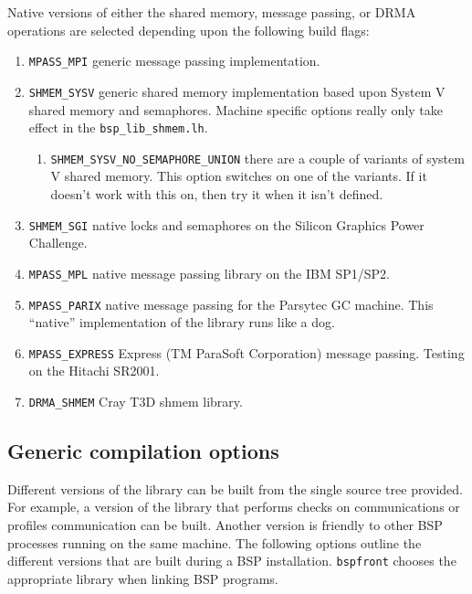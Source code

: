 Native versions of either the shared memory, message passing, or DRMA
operations are selected depending upon the following build flags:
\begin{enumerate}
\item \texttt{MPASS\_MPI} generic message passing implementation.

\item \texttt{SHMEM\_SYSV} generic shared memory implementation based
  upon System V shared memory and semaphores. Machine specific options
  really only take effect in the \texttt{bsp\_lib\_shmem.lh}.
  \begin{enumerate}
  \item \texttt{SHMEM\_SYSV\_NO\_SEMAPHORE\_UNION} there are a couple
    of variants of system V shared memory. This option switches
    on one of the variants. If it doesn't work with this on, then try
    it when it isn't defined.
  \end{enumerate}

\item \texttt{SHMEM\_SGI} native locks and semaphores on the Silicon
  Graphics Power Challenge.


\item \texttt{MPASS\_MPL} native message passing library on the IBM SP1/SP2.

\item \texttt{MPASS\_PARIX} native message passing for the Parsytec
  GC machine. This ``native'' implementation of the library runs like
  a dog.

\item \texttt{MPASS\_EXPRESS} Express (TM ParaSoft Corporation)
  message passing. Testing on the Hitachi SR2001.

\item \texttt{DRMA\_SHMEM} Cray T3D shmem library.
\end{enumerate}


\subsection{Generic compilation options}
Different versions of the library can be built from the single source
tree provided. For example, a version of the library that performs
checks on communications or profiles communication can be
built. Another version is friendly to other BSP processes running on
the same machine. The following options outline the different versions
that are built during a BSP installation. \texttt{bspfront} chooses
the appropriate library when linking BSP programs.

